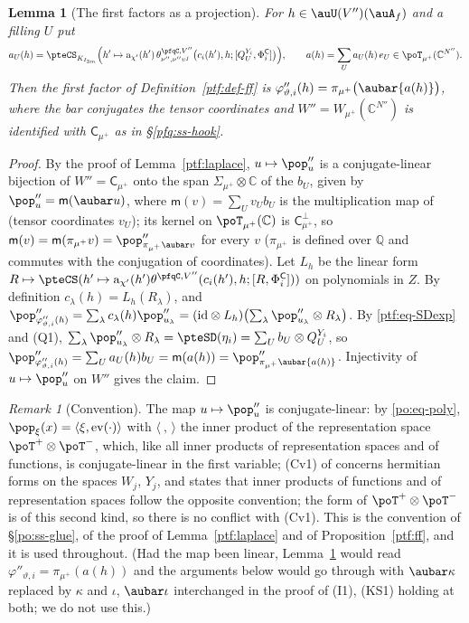 \documentclass[10pt]{amsart}
\newtheorem{lemma}[theorem]{Lemma}
\theoremstyle{definition}
\theoremstyle{remark}
\newtheorem{remark}[theorem]{Remark}
\newcommand{\C}{\mathbb C}
\newcommand{\Q}{\mathbb Q}
\begin{document}
\begin{lemma}[The first factors as a projection]\label{pfq:proj}
For $h\in\auU(V'')(\auA_f)$ and a filling $U$ put
\[
a_U(h)=\pteCS_{K_{I_{3m}}}\Bigl(h'\mapsto\mathrm a_{\chi'}(h')\,\theta^{\pfqC,V''}_{\nu'',\nu''\upsilon^j}\bigl(c_i(h'),h;[Q^{Y_i}_U,
\Phi^{\mathsf C}_i]\bigr)\Bigr),\qquad a(h)=\sum_Ua_U(h)\,e_U\in\poT_{\mu^+}(\C^{N''}).
\]
Then the first factor of Definition~\ref{ptf:def-ff} is $\varphi''_{\vartheta,i}(h)=\pi_{\mu^+}\bigl(\aubar{a(h)}\bigr)$, where the bar
conjugates the tensor coordinates and $W''=W_{\mu^+}(\C^{N''})$ is identified with $\mathsf C_{\mu^+}$ as in
\S\ref{pfq:ss-hook}.
\end{lemma}
\begin{proof}
By the proof of Lemma~\ref{ptf:laplace}, $u\mapsto\pop''_u$ is a conjugate-linear bijection of $W''=\mathsf C_{\mu^+}$ onto the span
$\Sigma_{\mu^+}\otimes\C$ of the $b_U$, given by $\pop''_u=\mathsf m(\aubar u)$, where $\mathsf m(v)=\sum_Uv_Ub_U$ is the multiplication
map of {\cite[\S5.2.6]{P49}} (tensor coordinates $v_U$); its kernel on $\poT_{\mu^+}(\C)$ is $\mathsf C_{\mu^+}^\perp$, so
$\mathsf m(v)=\mathsf m(\pi_{\mu^+}v)=\pop''_{\pi_{\mu^+}\aubar v}$ for every $v$ ($\pi_{\mu^+}$ is defined over $\Q$ and commutes with
the conjugation of coordinates). Let $L_h$ be the linear form $R\mapsto\pteCS(h'\mapsto\mathrm a_{\chi'}(h')\theta^{\pfqC,V''}(c_i(h'),h;
[R,\Phi^{\mathsf C}_i]))$ on polynomials in $Z$. By definition $c_\lambda(h)=L_h(R_\lambda)$, and $\pop''_{\varphi''_{\vartheta,i}(h)}=\sum_\lambda
c_\lambda(h)\pop''_{u_\lambda}=(\mathrm{id}\otimes L_h)\bigl(\sum_\lambda\pop''_{u_\lambda}\otimes R_\lambda\bigr)$. By \eqref{ptf:eq-SDexp} and (Q1),
$\sum_\lambda\pop''_{u_\lambda}\otimes R_\lambda=\pteSD(\eta_i)=\sum_Ub_U\otimes Q^{Y_i}_U$, so $\pop''_{\varphi''_{\vartheta,i}(h)}=\sum_Ua_U(h)b_U=
\mathsf m(a(h))=\pop''_{\pi_{\mu^+}\aubar{a(h)}}$. Injectivity of $u\mapsto\pop''_u$ on $W''$ gives the claim.
\end{proof}

\begin{remark}[Convention]\label{pfq:rem-linear}
The map $u\mapsto\pop''_u$ is conjugate-linear: by \eqref{po:eq-poly}, $\pop_\xi(x)=\langle\xi,\mathrm{ev}(\cdot)\rangle$
with $\langle\ ,\,\rangle$ the inner product of the representation space $\poT^+\otimes\poT^-$, which, like all
inner products of representation spaces and of functions, is conjugate-linear in the first variable;
(Cv1) of {\cite[\S2.1]{P51}} concerns hermitian forms on the spaces $W_j$, $Y_j$, and states that inner
products of functions and of representation spaces follow the opposite convention; the form of
$\poT^+\otimes\poT^-$ is of this second kind, so there is no conflict with (Cv1). This is the convention of \S\ref{po:ss-glue}, of the
proof of Lemma~\ref{ptf:laplace} and of Proposition~\ref{ptf:ff}, and it is used throughout. (Had the map been
linear, Lemma~\ref{pfq:proj} would read $\varphi''_{\vartheta,i}=\pi_{\mu^+}(a(h))$ and the arguments below would
go through with $\aubar\kappa$ replaced by $\kappa$ and $\iota$, $\aubar\iota$ interchanged in the proof of (I1),
(KS1) holding at both; we do not use this.)
\end{remark}
\end{document}
